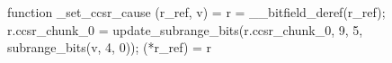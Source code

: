 function _set_ccsr_cause (r_ref, v) = {
    r = __bitfield_deref(r_ref);
    r.ccsr_chunk_0 = update_subrange_bits(r.ccsr_chunk_0, 9, 5, subrange_bits(v, 4, 0));
    (*r_ref) = r
}

